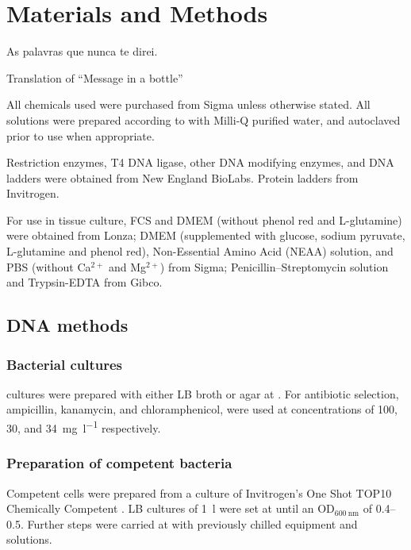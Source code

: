 \chapter{Materials and Methods}
\label{ch:methods}

\epigraph{As palavras que nunca te direi.}{Translation of ``Message in a bottle''}

\noindent
All chemicals used were purchased from Sigma unless otherwise stated. All solutions were prepared
according to  with Milli-Q purified water, and autoclaved prior to use when appropriate.

Restriction enzymes, T4 DNA ligase, other DNA modifying enzymes, and DNA ladders were obtained
from New England BioLabs. Protein ladders from Invitrogen.

For use in tissue culture, FCS and DMEM (without phenol red and L-glutamine) were obtained from Lonza;
DMEM (supplemented with glucose, sodium pyruvate, L-glutamine and phenol red), Non-Essential Amino Acid
(NEAA) solution, and PBS (without Ca$^{2+}$ and Mg$^{2+}$) from Sigma; Penicillin--Streptomycin solution
and Trypsin-EDTA from Gibco.

\section{DNA methods}
  \subsection{Bacterial cultures}
     cultures were prepared with either LB broth or agar at . For antibiotic
    selection, ampicillin, kanamycin, and chloramphenicol, were used at concentrations of 100, 30,
    and \SI{34}{\mg\per\l} respectively.

  \subsection{Preparation of competent bacteria}
    Competent  cells were prepared from a culture of Invitrogen's One Shot
    TOP10 Chemically Competent . LB cultures of \SI{1}{\l} were set at
     until an OD$_{\SI{600}{\nm}}$ of \numrange{0.4}{0.5}. Further steps were carried
    at  with previously chilled equipment and solutions.
    
